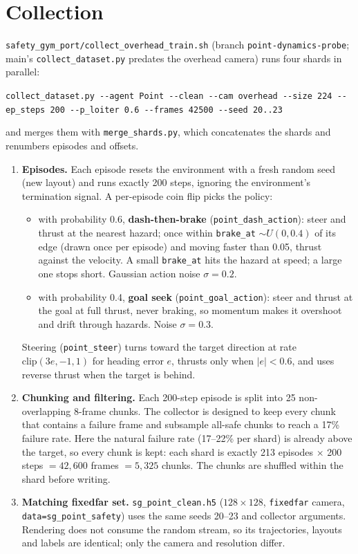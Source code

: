 \documentclass[11pt]{article}
\newcommand{\file}[1]{\nolinkurl{#1}}
\begin{document}
\section{Collection}

\file{safety_gym_port/collect_overhead_train.sh} (branch \file{point-dynamics-probe}; main's \file{collect_dataset.py} predates the overhead camera) runs four shards in parallel:

\begin{center}
\file{collect_dataset.py --agent Point --clean --cam overhead --size 224 --ep_steps 200 --p_loiter 0.6 --frames 42500 --seed 20..23}
\end{center}

and merges them with \file{merge_shards.py}, which concatenates the shards and renumbers episodes and offsets.

\begin{enumerate}
\item \textbf{Episodes.} Each episode resets the environment with a fresh random seed (new layout) and runs exactly 200 steps, ignoring the environment's termination signal. A per-episode coin flip picks the policy:
\begin{itemize}
\item with probability 0.6, \textbf{dash-then-brake} (\file{point_dash_action}): steer and thrust at the nearest hazard; once within \file{brake_at} $\sim U(0, 0.4)$ of its edge (drawn once per episode) and moving faster than 0.05, thrust against the velocity. A small \file{brake_at} hits the hazard at speed; a large one stops short. Gaussian action noise $\sigma = 0.2$.
\item with probability 0.4, \textbf{goal seek} (\file{point_goal_action}): steer and thrust at the goal at full thrust, never braking, so momentum makes it overshoot and drift through hazards. Noise $\sigma = 0.3$.
\end{itemize}
Steering (\file{point_steer}) turns toward the target direction at rate $\mathrm{clip}(3e, -1, 1)$ for heading error $e$, thrusts only when $|e| < 0.6$, and uses reverse thrust when the target is behind.
\item \textbf{Chunking and filtering.} Each 200-step episode is split into 25 non-overlapping 8-frame chunks. The collector is designed to keep every chunk that contains a failure frame and subsample all-safe chunks to reach a 17\% failure rate. Here the natural failure rate (17--22\% per shard) is already above the target, so every chunk is kept: each shard is exactly 213 episodes $\times$ 200 steps $= 42{,}600$ frames $= 5{,}325$ chunks. The chunks are shuffled within the shard before writing.
\item \textbf{Matching fixedfar set.} \file{sg_point_clean.h5} ($128 \times 128$, \file{fixedfar} camera, \file{data=sg_point_safety}) uses the same seeds 20--23 and collector arguments. Rendering does not consume the random stream, so its trajectories, layouts and labels are identical; only the camera and resolution differ.
\end{enumerate}
\end{document}
